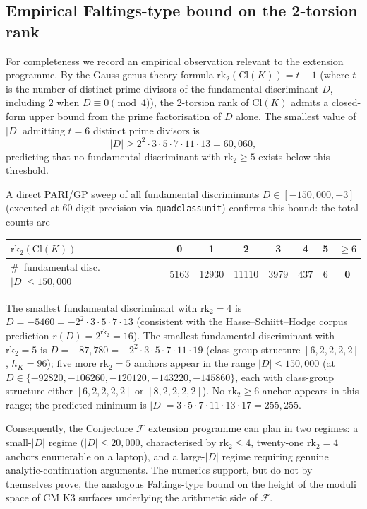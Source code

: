 \documentclass[11pt]{amsart}
\theoremstyle{definition}
\theoremstyle{remark}
\begin{document}
\subsection{Empirical Faltings-type bound on the 2-torsion
rank}\label{ss:faltings-bound}

For completeness we record an empirical observation relevant to the
extension programme. By the Gauss genus-theory formula
$\mathrm{rk}_2(\mathrm{Cl}(K)) = t - 1$ (where $t$ is the number of
distinct prime divisors of the fundamental discriminant $D$, including
$2$ when $D \equiv 0 \pmod 4$), the 2-torsion rank of $\mathrm{Cl}(K)$
admits a closed-form upper bound from the prime factorisation of $D$
alone. The smallest value of $|D|$ admitting $t = 6$ distinct prime
divisors is
\[
|D| \ge 2^2 \cdot 3 \cdot 5 \cdot 7 \cdot 11 \cdot 13 = 60{,}060,
\]
predicting that no fundamental discriminant with $\mathrm{rk}_2 \ge 5$
exists below this threshold.

A direct PARI/GP sweep of all fundamental discriminants
$D \in [-150{,}000, -3]$ (executed at $60$-digit precision via
\texttt{quadclassunit}) confirms this bound: the total counts are
\begin{center}
\begin{tabular}{l|ccccccc}
$\mathrm{rk}_2(\mathrm{Cl}(K))$ & 0 & 1 & 2 & 3 & 4 & 5 & $\ge 6$\\
\midrule
\#~fundamental disc.\ $|D| \le 150{,}000$ & 5163 & 12930 & 11110 & 3979 & 437 & 6 & \textbf{0}\\
\end{tabular}
\end{center}
The smallest fundamental discriminant with $\mathrm{rk}_2 = 4$ is
$D = -5460 = -2^2 \cdot 3 \cdot 5 \cdot 7 \cdot 13$ (consistent with
the Hasse--Schiitt--Hodge corpus prediction $r(D) = 2^{\mathrm{rk}_2}
= 16$). The smallest fundamental discriminant with
$\mathrm{rk}_2 = 5$ is $D = -87{,}780 = -2^2 \cdot 3 \cdot 5 \cdot 7
\cdot 11 \cdot 19$ (class group structure $[6, 2, 2, 2, 2]$,
$h_K = 96$); five more $\mathrm{rk}_2 = 5$ anchors appear in the
range $|D| \le 150{,}000$ (at $D \in \{-92820, -106260, -120120,
-143220, -145860\}$, each with class-group structure either
$[6, 2, 2, 2, 2]$ or $[8, 2, 2, 2, 2]$). No $\mathrm{rk}_2 \ge 6$
anchor appears in this range; the predicted minimum is
$|D| = 3 \cdot 5 \cdot 7 \cdot 11 \cdot 13 \cdot 17 = 255{,}255$.

Consequently, the Conjecture $\mathcal{F}$ extension programme can
plan in two regimes: a small-$|D|$ regime ($|D| \le 20{,}000$,
characterised by $\mathrm{rk}_2 \le 4$, twenty-one $\mathrm{rk}_2=4$
anchors enumerable on a laptop), and a large-$|D|$ regime requiring
genuine analytic-continuation arguments. The numerics support, but
do not by themselves prove, the analogous Faltings-type bound on
the height of the moduli space of CM K3 surfaces underlying the
arithmetic side of $\mathcal{F}$.
\end{document}
